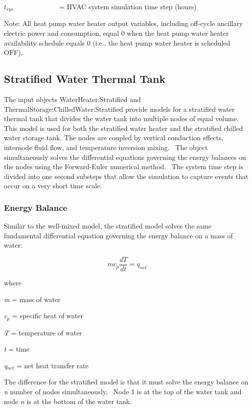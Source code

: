 \({t_{sys}}\) ~~~~~~~~~~~~ = HVAC system simulation time step (hours)

Note: All heat pump water heater output variables, including off-cycle ancillary electric power and consumption, equal 0 when the heat pump water heater availability schedule equals 0 (i.e., the heat pump water heater is scheduled OFF).

\subsection{Stratified Water Thermal Tank}\label{stratified-water-thermal-tank}

The input objects WaterHeater:Stratified and ThermalStorage:ChilledWater:Stratified provide models for a stratified water thermal tank that divides the water tank into multiple nodes of equal volume.~ This model is used for both the stratified water heater and the stratified chilled water storage tank. The nodes are coupled by vertical conduction effects, internode fluid flow, and temperature inversion mixing.~ The object simultaneously solves the differential equations governing the energy balances on the nodes using the Forward-Euler numerical method.~ The system time step is divided into one second substeps that allow the simulation to capture events that occur on a very short time scale.

\subsubsection{Energy Balance}\label{energy-balance-1}

Similar to the well-mixed model, the stratified model solves the same fundamental differential equation governing the energy balance on a mass of water:

\begin{equation}
m{c_p}\frac{{dT}}{{dt}} = {q_{net}}
\end{equation}

where

\emph{m} = mass of water

\emph{c\(_{p}\)} = specific heat of water

\emph{T} = temperature of water

\emph{t} = time

\emph{q\(_{net}\)} = net heat transfer rate

The difference for the stratified model is that it must solve the energy balance on \emph{n} number of nodes simultaneously.~ Node 1 is at the top of the water tank and node \emph{n} is at the bottom of the water tank.

